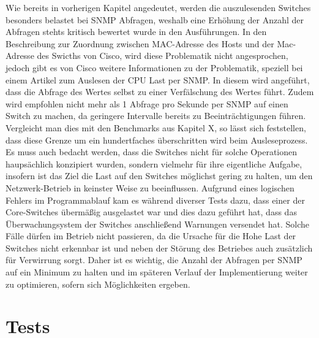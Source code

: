 Wie bereits in vorherigen Kapitel angedeutet, werden die auszulesenden Switches besonders belastet bei SNMP Abfragen, weshalb eine Erhöhung der Anzahl der Abfragen stehts kritisch bewertet wurde in den Ausführungen. In den Beschreibung zur Zuordnung zwischen MAC-Adresse des Hosts und der Mac-Adresse des Swicths von Cisco, wird diese Problematik nicht angesprochen, jedoch gibt es von Cisco weitere Informationen zu der Problematik, speziell bei einem Artikel zum Auslesen der CPU Last per SNMP. In diesem wird angeführt, dass die Abfrage des Wertes selbst zu einer Verfälschung des Wertes führt. Zudem wird empfohlen nicht mehr als 1 Abfrage pro Sekunde per SNMP auf einen Switch zu machen, da geringere Intervalle bereits zu Beeinträchtigungen führen. Vergleicht man dies mit den Benchmarks aus Kapitel X, so lässt sich feststellen, dass diese Grenze um ein hundertfaches überschritten wird beim Ausleseprozess. Es muss auch bedacht werden, dass die Switches nicht für solche Operationen haupsächlich konzipiert wurden, sondern vielmehr für ihre eigentliche Aufgabe, insofern ist das Ziel die Last auf den Switches möglichst gering zu halten, um den Netzwerk-Betrieb in keinster Weise zu beeinflussen. Aufgrund eines logischen Fehlers im Programmablauf kam es während diverser Tests dazu, dass einer der Core-Switches übermäßig ausgelastet war und dies dazu geführt hat, dass das Überwachungsystem der Switches anschließend Warnungen versendet hat. Solche Fälle dürfen im Betrieb nicht passieren, da die Ursache für die Hohe Last der Switches nicht erkennbar ist und neben der Störung des Betriebes auch zusätzlich für Verwirrung sorgt. Daher ist es wichtig, die Anzahl der Abfragen per SNMP auf ein Minimum zu halten und im späteren Verlauf der Implementierung weiter zu optimieren, sofern sich Möglichkeiten ergeben.

\section{Tests}
\label{sec:tests}

